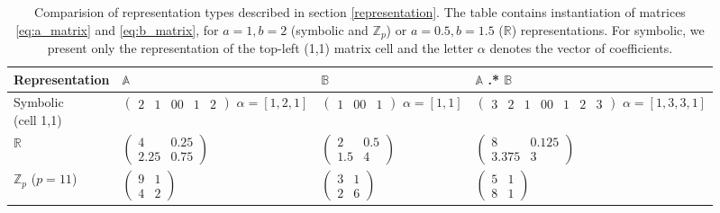 \begin{table}
\tiny
\centering
\begin{tabular}{llll}
\hline
Representation & $\mathbb{A}$ & $\mathbb{B}$ & $\mathbb{A}$ .* $\mathbb{B}$ \\
\hline
\specialcell{Symbolic\\(cell 1,1)} & \specialcell{$\begin{pmatrix} 2 & 1 & 0\\ 0 & 1 & 2 \end{pmatrix}$\\$\alpha = [1, 2, 1]$}  & \specialcell{$\begin{pmatrix} 1 & 0 \\ 0 & 1 \end{pmatrix}$\\$\alpha = [1, 1]$} & \specialcell{$\begin{pmatrix} 3 & 2 & 1 & 0 \\ 0 & 1 & 2 & 3 \end{pmatrix}$\\$\alpha = [1, 3, 3, 1]$} \\[15pt]

$\mathbb{R}$ & $\begin{pmatrix} 4 & 0.25\\ 2.25 & 0.75 \end{pmatrix}$ & $\begin{pmatrix} 2 & 0.5\\ 1.5 & 4 \end{pmatrix}$ & $\begin{pmatrix} 8 & 0.125\\ 3.375 & 3 \end{pmatrix}$ \\[15pt]

$\mathbb{Z}_p$ ($p=11$) & $\begin{pmatrix} 9 & 1\\ 4 & 2 \end{pmatrix}$ & $\begin{pmatrix} 3 & 1\\ 2 & 6 \end{pmatrix}$ & $\begin{pmatrix} 5 & 1\\ 8 & 1 \end{pmatrix}$ \\
\hline
\end{tabular}
\caption{Comparision of representation types described in section \ref{representation}. The table contains instantiation of matrices \ref{eq:a_matrix} and \ref{eq:b_matrix}, for $a=1, b=2$ (symbolic and $\mathbb{Z}_p$) or $a=0.5, b=1.5$ ($\mathbb{R}$) representations. For symbolic, we present only the representation of the top-left (1,1) matrix cell and the letter $\alpha$ denotes the vector of coefficients.} 
\label{representation_examples}
\end{table}

